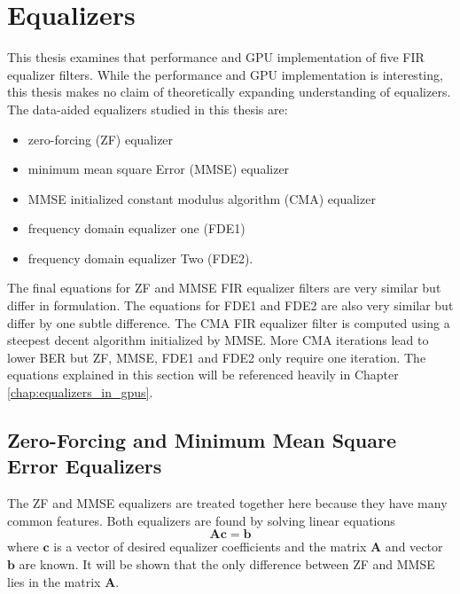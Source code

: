 \section{Equalizers}
\label{sec:equalizer_eq}
This thesis examines that performance and GPU implementation of five FIR equalizer filters.
While the performance and GPU implementation is interesting, this thesis makes no claim of theoretically expanding understanding of equalizers.
The data-aided equalizers studied in this thesis are:
\begin{itemize}
\item zero-forcing (ZF) equalizer
\item minimum mean square Error (MMSE) equalizer
\item MMSE initialized constant modulus algorithm (CMA) equalizer
\item frequency domain equalizer one (FDE1)
\item frequency domain equalizer Two (FDE2).
\end{itemize}
The final equations for ZF and MMSE FIR equalizer filters are very similar but differ in formulation.
The equations for FDE1 and FDE2 are also very similar but differ by one subtle difference.
The CMA FIR equalizer filter is computed using a steepest decent algorithm initialized by MMSE.
More CMA iterations lead to lower BER but ZF, MMSE, FDE1 and FDE2 only require one iteration.
The equations explained in this section will be referenced heavily in Chapter \ref{chap:equalizers_in_gpus}.

\subsection{Zero-Forcing and Minimum Mean Square Error Equalizers}
\label{sec:ZFnMMSE}
The ZF and MMSE equalizers are treated together here because they have many common features.
Both equalizers are found by solving linear equations
\begin{equation}
\mathbf{A}\mathbf{c} = \mathbf{b}
\end{equation}
where $\mathbf{c}$ is a vector of desired equalizer coefficients
and the matrix $\mathbf{A}$ and vector $\mathbf{b}$ are known.
It will be shown that the only difference between ZF and MMSE lies in the matrix $\mathbf{A}$.

